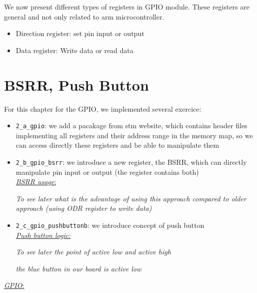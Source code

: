 \documentclass[12pt,a4paper]{book}
\begin{document}
We now present  different types of registers in GPIO module. These registers are general and not only related to arm microcontroller.

\begin{itemize}

\item Direction register: set pin input or output

\item  Data register: Write data or read data 

\end{itemize}


\section{BSRR, Push Button}

For this chapter for the GPIO, we implemented several exercice:

\begin{itemize}

\item \verb|2_a_gpio|: we add a pacakage from stm website, which contains header files implementing all registers and their address range in the memory map, so we can access directly these registers and be able to manipulate them

\item \verb|2_b_gpio_bsrr|: we introduce a new register, the BSRR, which can directly manipulate pin input or output (the register contains both)\\

 \underline{\textit{BSRR usage}:}

\textit{To see later what is the advantage of using this approach compared to older approach (using ODR register to write data)} 

\item  \verb|2_c_gpio_pushbuttonb|: we introduce concept of push button\\

 \underline{\textit{Push button logic}:}

\textit{To see later the point of active low and active high}

\textit{the blue button in our board is active low}




\end{itemize}



 \underline{\textit{GPIO}:}
\end{document}
